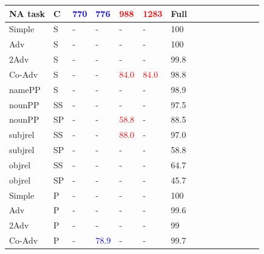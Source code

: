 \begin{center}
\begin{table}[ht]
\begin{tabular}{|P{1.4cm}|P{0.4cm}||P{0.6cm}|P{0.6cm}|P{0.6cm}|P{0.6cm}|P{0.6cm}|P{0.6cm}|P{0.6cm}|P{0.6cm}|P{0.6cm}|P{0.6cm}|P{0.6cm}|P{0.6cm}||P{0.6cm}|}
\hline
\B NA task & \B C & \B \textcolor{blue}{770} & \B \textcolor{blue}{776} & \B \textcolor{red}{988} & \B \textcolor{red}{1283} & \B Full \\
\hline
\hline


\B Simple & \B S & - &  - &    - &  - &  100 \\

\B Adv & \B S &  - &  - &  - &  - &  100 \\

\B 2Adv & \B S &  - &  - &  - &  - &  99.8 \\

\B Co-Adv & \B S &  - &  - &  \textcolor{red}{84.0} &  \textcolor{red}{84.0} &  98.8 \\

\B namePP & \B S &  - &  - &  - &  - &  98.9 \\

\B nounPP & \B SS &  - &  - & - &  - &  97.5 \\

\B nounPP & \B SP &  \B - &  - &  \textcolor{red}{58.8} &  - &  88.5 \\

\B subjrel & \B SS &   - &  - & \textcolor{red}{88.0} &  - &  97.0 \\

\B subjrel & \B SP &  \B - &  - &  - &  - &  58.8 \\

\B objrel & \B SS & \B - &  - &  - &  - &  64.7 \\

\B objrel & \B SP &  \B - &  - &  - &  - &  45.7 \\

\hline
\B Simple & \B P &  - &  - &  - &  - &  100 \\

\B Adv & \B P &  - &  - &  - &  - &  99.6 \\

\B 2Adv & \B P & - &  - & - & - &  99 \\

\B Co-Adv & \B P &  - &  \textcolor{blue}{78.9} & - &  - &  99.7 \\


\end{tabular}
\end{table}
\end{center}
